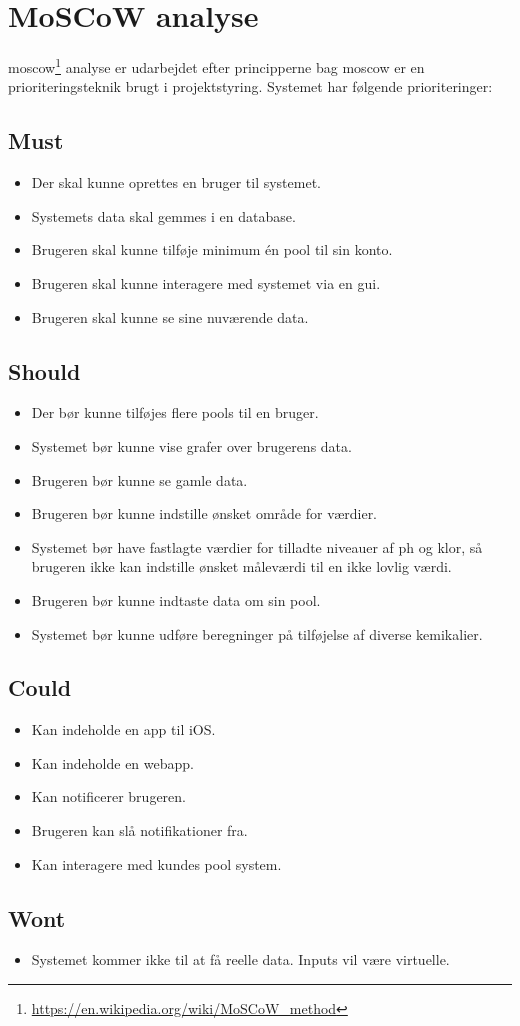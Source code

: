 \section{MoSCoW analyse}\label{sec:moscow}
\gls{moscow}\footnote{\url{https://en.wikipedia.org/wiki/MoSCoW_method}} analyse er udarbejdet efter principperne bag \gls{moscow} er en prioriteringsteknik brugt i projektstyring. Systemet har følgende prioriteringer:

\subsection*{Must}
\begin{itemize}
	\item Der skal kunne oprettes en bruger til systemet.
	\item Systemets data skal gemmes i en database.  
	\item Brugeren skal kunne tilføje minimum én pool til sin konto. 
	\item Brugeren skal kunne interagere med systemet via en \gls{gui}. 
	\item Brugeren skal kunne se sine nuværende data.
\end{itemize}

\subsection*{Should}
\begin{itemize}
	\item Der bør kunne tilføjes flere pools til en bruger. 
	\item Systemet bør kunne vise grafer over brugerens data.
	\item Brugeren bør kunne se gamle data.
	\item Brugeren bør kunne indstille ønsket område for værdier.
	\item Systemet bør have fastlagte værdier for tilladte niveauer af ph og klor, så brugeren ikke kan indstille ønsket måleværdi til en ikke lovlig værdi.
	\item Brugeren bør kunne indtaste data om sin pool.
	\item Systemet bør kunne udføre beregninger på tilføjelse af diverse kemikalier.
\end{itemize}

\subsection*{Could}
\begin{itemize}
	\item Kan indeholde en app til iOS.
	\item Kan indeholde en \gls{webapp}.
	\item Kan notificerer brugeren.
	\item Brugeren kan slå notifikationer fra.
	\item Kan interagere med kundes pool system.
\end{itemize}

\subsection*{Wont}
\begin{itemize}
	\item Systemet kommer ikke til at få reelle data. Inputs vil være virtuelle.
\end{itemize}
